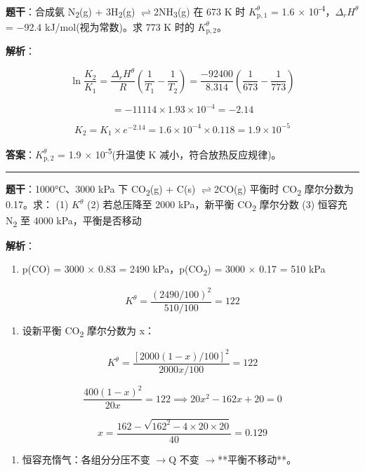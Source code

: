 \documentclass[a4paper,11pt]{ctexart}
\providecommand{\tightlist}{\setlength{\itemsep}{0pt}\setlength{\parskip}{0pt}}
\newcommand{\箭}{\ensuremath{\rightarrow}}
\newcommand{\左箭}{\ensuremath{\leftarrow}}
\newcommand{\上箭}{\ensuremath{\uparrow}}
\newcommand{\下箭}{\ensuremath{\downarrow}}
\newcommand{\衡}{\ensuremath{\rightleftharpoons}}
\newcommand{\双箭}{\ensuremath{\leftrightarrow}}
\newcommand{\约等于}{\ensuremath{\approx}}
\newcommand{\小于等于}{\ensuremath{\leq}}
\newcommand{\大于等于}{\ensuremath{\geq}}
\newcommand{\不等于}{\ensuremath{\neq}}
\newcommand{\西格马}{\ensuremath{\sigma}}
\newcommand{\派}{\ensuremath{\pi}}
\begin{document}
\textbf{题干}：合成氨 N\textsubscript{2}(g) + 3H\textsubscript{2}(g) \衡 2NH\textsubscript{3}(g) 在 673 K 时 \(K_{\mathrm p,1}^\theta\) = 1.6 × 10\textsuperscript{-4}，\(\Delta_r H^\theta\) = −92.4 kJ/mol(视为常数)。求 773 K 时的 \(K_{\mathrm p,2}^\theta\)。

\textbf{解析}：

\[\ln\frac{K_2}{K_1} = \frac{\Delta_r H^\theta}{R}\left(\frac{1}{T_1} - \frac{1}{T_2}\right) = \frac{-92400}{8.314}\left(\frac{1}{673} - \frac{1}{773}\right)\]

\[= -11114 \times 1.93 \times 10^{-4} = -2.14\]

\[K_2 = K_1 \times e^{-2.14} = 1.6 \times 10^{-4} \times 0.118 = 1.9 \times 10^{-5}\]

\textbf{答案}：\(K_{\mathrm p,2}^\theta\) = 1.9 × 10\textsuperscript{-5}(升温使 K 减小，符合放热反应规律)。

\begin{center}\rule{0.5\linewidth}{0.5pt}\end{center}

\textbf{题干}：1000°C、3000 kPa 下 CO\textsubscript{2}(g) + C(s) \衡 2CO(g) 平衡时 CO\textsubscript{2} 摩尔分数为 0.17。求：
(1) \(K^\theta\)
(2) 若总压降至 2000 kPa，新平衡 CO\textsubscript{2} 摩尔分数
(3) 恒容充 N\textsubscript{2} 至 4000 kPa，平衡是否移动

\textbf{解析}：

\begin{enumerate}
\def\labelenumi{(\arabic{enumi})}
\tightlist
\item
  p(CO) = 3000 × 0.83 = 2490 kPa，p(CO\textsubscript{2}) = 3000 × 0.17 = 510 kPa
\end{enumerate}

\[K^\theta = \frac{(2490/100)^2}{510/100} = 122\]

\begin{enumerate}
\def\labelenumi{(\arabic{enumi})}
\setcounter{enumi}{1}
\tightlist
\item
  设新平衡 CO\textsubscript{2} 摩尔分数为 x：
\end{enumerate}

\[K^\theta = \frac{[2000(1-x)/100]^2}{2000x/100} = 122\]

\[\frac{400(1-x)^2}{20x} = 122 \implies 20x^2 - 162x + 20 = 0\]

\[x = \frac{162 - \sqrt{162^2 - 4 \times 20 \times 20}}{40} = 0.129\]

\begin{enumerate}
\def\labelenumi{(\arabic{enumi})}
\setcounter{enumi}{2}
\tightlist
\item
  恒容充惰气：各组分分压不变 \箭 Q 不变 \箭 **平衡不移动**。
\end{enumerate}
\end{document}
